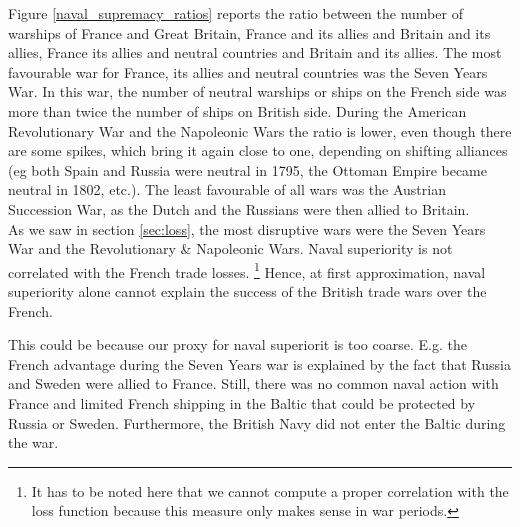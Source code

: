 \documentclass[12pt,a4paper,notitlepage,english]{article}
\begin{document}
Figure \ref{naval_supremacy_ratios} reports the ratio between the number of warships of France and Great Britain, France and its allies and Britain and its allies, France its allies and neutral countries and Britain and its allies.
The most favourable war for France, its allies and neutral countries was the Seven Years War.
In this war, the number of neutral warships or ships on the French side was more than twice the number of ships on British side.
During the American Revolutionary War and the Napoleonic Wars the ratio is lower, even though there are some spikes, which bring it again close to one, depending on shifting alliances (eg both Spain and Russia were neutral in 1795, the Ottoman Empire became neutral in 1802, etc.). 
The least favourable of all wars was the Austrian Succession War, as the Dutch and the Russians were then allied to Britain.  \\
As we saw in section \ref{sec:loss}, the most disruptive wars were the Seven Years War and the Revolutionary \& Napoleonic Wars.
Naval superiority is not correlated with the French trade losses.
\footnote{It has to be noted here that we cannot compute a proper correlation with the loss function because this measure only makes sense in war periods.}
Hence, at first approximation, naval superiority alone cannot explain the success of the British trade wars over the French. 

This could be because our proxy for naval superiorit is too coarse.
E.g. the French advantage during the Seven Years war is explained by the fact that Russia and Sweden were allied to France.
Still, there was no common naval action with France and limited French shipping in the Baltic that could be protected by Russia or Sweden.
Furthermore, the British Navy did not enter the Baltic during the war.
 
\end{document}
